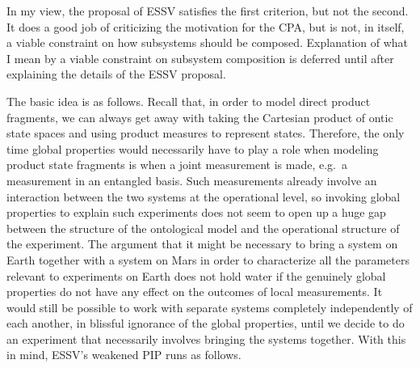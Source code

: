 \documentclass[DIV=calc,fontsize=12pt]{scrartcl} %
\theoremstyle{definition}
\theoremstyle{plain}
\begin{document}
In my view, the proposal of ESSV satisfies the first criterion, but
not the second.  It does a good job of criticizing the motivation for
the CPA, but is not, in itself, a viable constraint on how subsystems
should be composed.  Explanation of what I mean by a viable constraint
on subsystem composition is deferred until after explaining the details
of the ESSV proposal.

The basic idea is as follows.  Recall that, in order to model direct
product fragments, we can always get away with taking the Cartesian
product of ontic state spaces and using product measures to represent
states.  Therefore, the only time global properties would necessarily
have to play a role when modeling product state fragments is when a
joint measurement is made, e.g.\ a measurement in an entangled basis.
Such measurements already involve an interaction between the two
systems at the operational level, so invoking global properties to
explain such experiments does not seem to open up a huge gap between
the structure of the ontological model and the operational structure
of the experiment.  The argument that it might be necessary to bring a
system on Earth together with a system on Mars in order to
characterize all the parameters relevant to experiments on Earth does
not hold water if the genuinely global properties do not have any
effect on the outcomes of local measurements.  It would still be
possible to work with separate systems completely independently of
each another, in blissful ignorance of the global properties, until we
decide to do an experiment that necessarily involves bringing the
systems together.  With this in mind, ESSV's weakened PIP runs as
follows.
\end{document}
